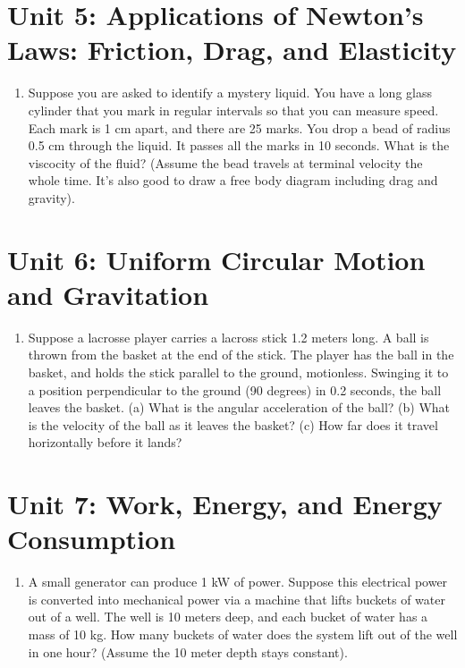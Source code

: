 \documentclass[10pt]{article}
\begin{document}
\section{Unit 5: Applications  of Newton's Laws: Friction, Drag, and Elasticity}
\begin{enumerate}
\item Suppose you are asked to identify a mystery liquid.  You have a long glass cylinder that you mark in regular intervals so that you can measure speed.  Each mark is 1 cm apart, and there are 25 marks.  You drop a bead of radius 0.5 cm through the liquid.  It passes all the marks in 10 seconds.  What is the viscocity of the fluid?  (Assume the bead travels at terminal velocity the whole time.  It's also good to draw a free body diagram including drag and gravity).  \\ \vspace{2.75cm}
\end{enumerate}

\section{Unit 6: Uniform Circular Motion and Gravitation}
\begin{enumerate}
\item Suppose a lacrosse player carries a lacross stick 1.2 meters long.  A ball is thrown from the basket at the end of the stick.  The player has the ball in the basket, and holds the stick parallel to the ground, motionless.  Swinging it to a position perpendicular to the ground (90 degrees) in 0.2 seconds, the ball leaves the basket.  (a) What is the angular acceleration of the ball?  (b) What is the velocity of the ball as it leaves the basket?  (c) How far does it travel horizontally before it lands? \\ \vspace{2.75cm}
\end{enumerate}

\section{Unit 7: Work, Energy, and Energy Consumption}
\begin{enumerate}
\item A small generator can produce 1 kW of power.  Suppose this electrical power is converted into mechanical power via a machine that lifts buckets of water out of a well.  The well is 10 meters deep, and each bucket of water has a mass of 10 kg.  How many buckets of water does the system lift out of the well in one hour?  (Assume the 10 meter depth stays constant). \\ \vspace{2.75cm}
\end{enumerate}
\end{document}
